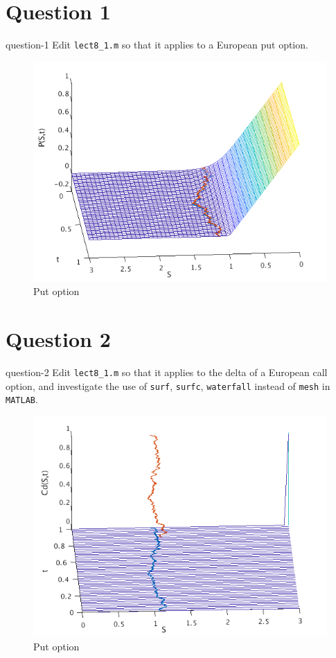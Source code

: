 \section{Question 1}
\begin{statebox}{}{question-1}
    Edit \texttt{lect8\_1.m} so that it applies to a European put option.
\end{statebox}
\begin{figure}[H]
    \centering
    \includegraphics[width=.7\textwidth]{figures/2019-11-27-put.png}
    \caption{Put option}\label{F:1}
\end{figure}


\section{Question 2}
\begin{statebox}{}{question-2}
    Edit \texttt{lect8\_1.m} so that it applies to the delta of a European call option, and investigate the use of \texttt{surf}, \texttt{surfc}, \texttt{waterfall} instead of \texttt{mesh} in \texttt{MATLAB}.
\end{statebox}
\begin{figure}[H]
    \centering
    \includegraphics[width=.7\textwidth]{figures/2019-11-27-call-delta.png}
    \caption{Put option}\label{F:1}
\end{figure}
